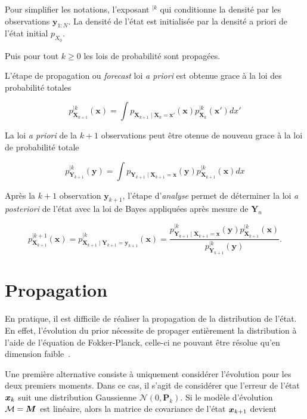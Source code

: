 Pour simplifier les notations, l'exposant $^{\mid k}$ qui conditionne la densité par les observations $\bm y_{1:N}$.
La densité de l'état est initialisée par la densité a priori de l'état initial $p_{X_0}$.

Puis pour tout $k \geq 0$ les lois de probabilité sont propagées.

L'étape de propagation ou \textit{forecast} loi \textit{a priori} est obtenue grace à la loi des probabilité totales

\begin{equation}\label{tot_rule}
    p_{\bm X_{k+1}}^{\mid k}(\bm x)= \int p_{\bm X_{k+1}\mid \bm X_{k} = \bm x'}(\bm x) p_{\bm X_{k}}^{\mid k}(\bm x')dx'
\end{equation}

La loi \textit{a priori} de la $k+1$ observations peut être otenue de nouveau grace à la loi de probabilité totale

\begin{equation*}
    p_{\bm Y_{k+1}}^{\mid k}(\bm y) = \int p_{\bm Y_{k+1}\mid \bm X_{k+1} = \bm x}(\bm y) p_{\bm X_{k+1}}^{\mid k}(\bm x)dx
\end{equation*}

Après la $k+1$ observation $\bm y_{k+1}$, l'étape d'\textit{analyse} permet de déterminer la loi \textit{a posteriori} de l'état
avec la loi de Bayes appliquées après mesure de $\bm Y_n$

\begin{equation*}
    p_{\bm X_{k+1}}^{\mid k+1}(\bm x) = p_{\bm X_{k+1} \mid \bm Y_{k+1} = \bm y_{k+1}}^{\mid k}(\bm x) = \frac{p_{\bm Y_{k+1} \mid \bm X_{k+1} = \bm x}^{\mid k}(\bm y) p_{\bm X_{k+1}}^{\mid k}(\bm x) }{p_{\bm Y_{k+1}}^{\mid k}(\bm y)}.
\end{equation*}


\section{Propagation}

En pratique, il est difficile de réaliser la propagation de la distribution de l'état.
En effet, l'évolution du prior nécessite de propager entièrement la distribution à l'aide de l'équation de Fokker-Planck, celle-ci ne pouvant être résolue qu'en dimension faible~\cite{jazwinski_4_1970}.

Une première alternative consiste à uniquement considérer l'évolution pour les deux premiers moments. Dans ce cas, il s'agit de considérer que l'erreur de l'état $\bm{x}_k$ suit une distribution Gaussienne $\mathcal{N} (0, \bm P_k)$. Si le modèle d'évolution $\mathcal{M} = \bm{M}$ est linéaire, alors la matrice de covariance de l'état $\bm{x}_{k+1}$ devient

